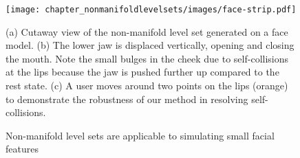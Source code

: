 \begin{figure}
  \centering
\texttt{[image: chapter\_nonmanifoldlevelsets/images/face-strip.pdf]}
\vspace*{-.1in}
\caption{Non-manifold level sets are applicable to simulating small
  facial features}{(a) Cutaway view of the non-manifold level set
  generated on a face model. (b) The lower jaw is displaced
  vertically, opening and closing the mouth. Note the small bulges in
  the cheek due to self-collisions at the lips because the jaw is
  pushed further up compared to the rest state.  (c) A user moves
  around two points on the lips (orange) to demonstrate the robustness
  of our method in resolving self-collisions. }
\label{fig:face}
\vspace*{-.15in}
\end{figure}




